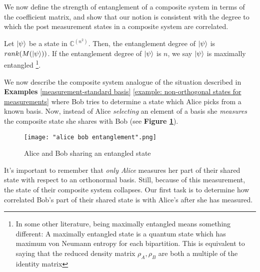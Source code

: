 We now define the strength of entanglement of a composite system in terms of the coefficient matrix, and show that our notion is consistent with the degree to which the post measurement states in a composite system are correlated.

\begin{definition} \label{def: maximally entangled}
 Let $\ket{\psi}$ be a state in ${\mathbb{C}}^{(n^2)}$.  Then, the entanglement degree of $\ket{\psi}$ is $rank(M(\ket{\psi}))$.  If the entanglement degree of $\ket{\psi}$ is $n$, we say $\ket{\psi}$ is maximally entangled \footnote{In some other literature, being maximally entangled means something different: A maximally entangled state is a quantum state which has maximum von Neumann entropy for each bipartition. This is equivalent to saying that the reduced density matrix $\rho_A, \rho_B$ are both a multiple of the identity matrix}.
\end{definition}


We now describe the composite system analogue of the situation described in {\bf{Examples}} \ref{measurement-standard basis} \ref{example: non-orthogonal states for measurements} where Bob tries to determine a state which Alice picks from a known basis.  Now, instead of Alice {\emph{selecting}} an element of a basis she {\emph{measures}} the composite state she shares with Bob (see \textbf{Figure \ref{fig:entanglement}}).

\begin{figure}[h]
    \centering
    \texttt{[image: "alice bob entanglement".png]}
    \caption{Alice and Bob sharing an entangled state}
    \label{fig:entanglement}
\end{figure}

It's important to remember that {\emph{only Alice}} measures her part of their shared state with respect to an orthonormal basis.  Still, because of this measurement, the state of their composite system collapses.  Our first task is to determine how correlated Bob's part of their shared state is with Alice's after she has measured.  

